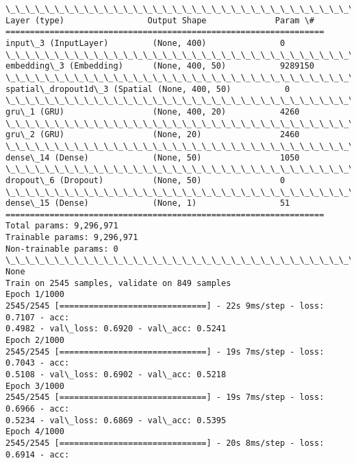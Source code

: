 \documentclass[11pt]{article}
\begin{document}
    \begin{Verbatim}[commandchars=\\\{\}]
\_\_\_\_\_\_\_\_\_\_\_\_\_\_\_\_\_\_\_\_\_\_\_\_\_\_\_\_\_\_\_\_\_\_\_\_\_\_\_\_\_\_\_\_\_\_\_\_\_\_\_\_\_\_\_\_\_\_\_\_\_\_\_\_\_
Layer (type)                 Output Shape              Param \#
=================================================================
input\_3 (InputLayer)         (None, 400)               0
\_\_\_\_\_\_\_\_\_\_\_\_\_\_\_\_\_\_\_\_\_\_\_\_\_\_\_\_\_\_\_\_\_\_\_\_\_\_\_\_\_\_\_\_\_\_\_\_\_\_\_\_\_\_\_\_\_\_\_\_\_\_\_\_\_
embedding\_3 (Embedding)      (None, 400, 50)           9289150
\_\_\_\_\_\_\_\_\_\_\_\_\_\_\_\_\_\_\_\_\_\_\_\_\_\_\_\_\_\_\_\_\_\_\_\_\_\_\_\_\_\_\_\_\_\_\_\_\_\_\_\_\_\_\_\_\_\_\_\_\_\_\_\_\_
spatial\_dropout1d\_3 (Spatial (None, 400, 50)           0
\_\_\_\_\_\_\_\_\_\_\_\_\_\_\_\_\_\_\_\_\_\_\_\_\_\_\_\_\_\_\_\_\_\_\_\_\_\_\_\_\_\_\_\_\_\_\_\_\_\_\_\_\_\_\_\_\_\_\_\_\_\_\_\_\_
gru\_1 (GRU)                  (None, 400, 20)           4260
\_\_\_\_\_\_\_\_\_\_\_\_\_\_\_\_\_\_\_\_\_\_\_\_\_\_\_\_\_\_\_\_\_\_\_\_\_\_\_\_\_\_\_\_\_\_\_\_\_\_\_\_\_\_\_\_\_\_\_\_\_\_\_\_\_
gru\_2 (GRU)                  (None, 20)                2460
\_\_\_\_\_\_\_\_\_\_\_\_\_\_\_\_\_\_\_\_\_\_\_\_\_\_\_\_\_\_\_\_\_\_\_\_\_\_\_\_\_\_\_\_\_\_\_\_\_\_\_\_\_\_\_\_\_\_\_\_\_\_\_\_\_
dense\_14 (Dense)             (None, 50)                1050
\_\_\_\_\_\_\_\_\_\_\_\_\_\_\_\_\_\_\_\_\_\_\_\_\_\_\_\_\_\_\_\_\_\_\_\_\_\_\_\_\_\_\_\_\_\_\_\_\_\_\_\_\_\_\_\_\_\_\_\_\_\_\_\_\_
dropout\_6 (Dropout)          (None, 50)                0
\_\_\_\_\_\_\_\_\_\_\_\_\_\_\_\_\_\_\_\_\_\_\_\_\_\_\_\_\_\_\_\_\_\_\_\_\_\_\_\_\_\_\_\_\_\_\_\_\_\_\_\_\_\_\_\_\_\_\_\_\_\_\_\_\_
dense\_15 (Dense)             (None, 1)                 51
=================================================================
Total params: 9,296,971
Trainable params: 9,296,971
Non-trainable params: 0
\_\_\_\_\_\_\_\_\_\_\_\_\_\_\_\_\_\_\_\_\_\_\_\_\_\_\_\_\_\_\_\_\_\_\_\_\_\_\_\_\_\_\_\_\_\_\_\_\_\_\_\_\_\_\_\_\_\_\_\_\_\_\_\_\_
None
Train on 2545 samples, validate on 849 samples
Epoch 1/1000
2545/2545 [==============================] - 22s 9ms/step - loss: 0.7107 - acc:
0.4982 - val\_loss: 0.6920 - val\_acc: 0.5241
Epoch 2/1000
2545/2545 [==============================] - 19s 7ms/step - loss: 0.7043 - acc:
0.5108 - val\_loss: 0.6902 - val\_acc: 0.5218
Epoch 3/1000
2545/2545 [==============================] - 19s 7ms/step - loss: 0.6966 - acc:
0.5234 - val\_loss: 0.6869 - val\_acc: 0.5395
Epoch 4/1000
2545/2545 [==============================] - 20s 8ms/step - loss: 0.6914 - acc:

\end{Verbatim}
\end{document}
